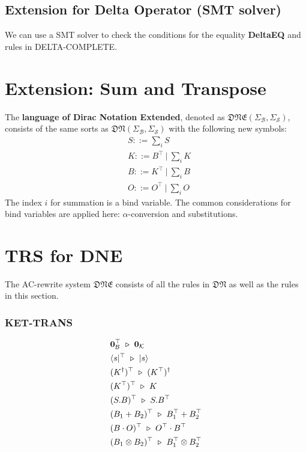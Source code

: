 \subsection{Extension for Delta Operator (SMT solver)}
We can use a SMT solver to check the conditions for the equality \textbf{DeltaEQ} and rules in \textsf{DELTA-COMPLETE}.


\section{Extension: Sum and Transpose}

\begin{definition}[DNE]
    The \textbf{language of Dirac Notation Extended}, denoted as $\mathfrak{DNE}(\Sigma_\mathcal{B}, \Sigma_\mathcal{S})$, consists of the same sorts as $\mathfrak{DN}(\Sigma_\mathcal{B}, \Sigma_\mathcal{S})$ with the following new symbols:
    \begin{align*}
        & S ::= \sum_i S \\
        & K ::= B^\top\ |\ \sum_i K \\
        & B ::= K^\top\ |\ \sum_i B \\
        & O ::= O^\top\ |\ \sum_i O
    \end{align*}
    The index $i$ for summation is a bind variable. The common considerations for bind variables are applied here: $\alpha$-conversion and substitutions.
\end{definition}


\section{TRS for DNE}

\begin{definition}
    The AC-rewrite system $\mathfrak{DNE}$ consists of all the rules in $\mathfrak{DN}$ as well as the rules in this section.
\end{definition}

\subsubsection*{\textsf{KET-TRANS}}
\begin{align*}
  & \mathbf{0}_\mathcal{B}^\top \ \triangleright\  \mathbf{0}_\mathcal{K} \\
  & \langle s|^\top \ \triangleright\  |s\rangle \\
  & (K^\dagger)^\top \ \triangleright\  (K^\top)^\dagger \\
  & (K^\top)^\top \ \triangleright\  K \\
  & (S . B)^\top \ \triangleright\  S . B^\top \\
  & (B_1 + B_2)^\top \ \triangleright\  B_1^\top + B_2^\top \\
  & (B \cdot O)^\top \ \triangleright\  O^\top \cdot B^\top \\
  & (B_1 \otimes B_2)^\top \ \triangleright\  B_1^\top \otimes B_2^\top
\end{align*}


